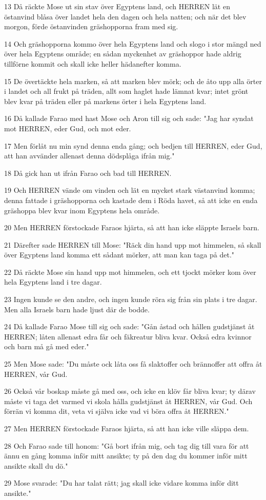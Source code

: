\par 13 Då räckte Mose ut sin stav över Egyptens land, och HERREN lät en östanvind blåsa över landet hela den dagen och hela natten; och när det blev morgon, förde östanvinden gräshopporna fram med sig.
\par 14 Och gräshopporna kommo över hela Egyptens land och slogo i stor mängd ned över hela Egyptens område; en sådan myckenhet av gräshoppor hade aldrig tillförne kommit och skall icke heller hädanefter komma.
\par 15 De övertäckte hela marken, så att marken blev mörk; och de åto upp alla örter i landet och all frukt på träden, allt som haglet hade lämnat kvar; intet grönt blev kvar på träden eller på markens örter i hela Egyptens land.
\par 16 Då kallade Farao med hast Mose och Aron till sig och sade: "Jag har syndat mot HERREN, eder Gud, och mot eder.
\par 17 Men förlåt nu min synd denna enda gång; och bedjen till HERREN, eder Gud, att han avvänder allenast denna dödsplåga ifrån mig."
\par 18 Då gick han ut ifrån Farao och bad till HERREN.
\par 19 Och HERREN vände om vinden och lät en mycket stark västanvind komma; denna fattade i gräshopporna och kastade dem i Röda havet, så att icke en enda gräshoppa blev kvar inom Egyptens hela område.
\par 20 Men HERREN förstockade Faraos hjärta, så att han icke släppte Israels barn.
\par 21 Därefter sade HERREN till Mose: "Räck din hand upp mot himmelen, så skall över Egyptens land komma ett sådant mörker, att man kan taga på det."
\par 22 Då räckte Mose sin hand upp mot himmelen, och ett tjockt mörker kom över hela Egyptens land i tre dagar.
\par 23 Ingen kunde se den andre, och ingen kunde röra sig från sin plats i tre dagar. Men alla Israels barn hade ljust där de bodde.
\par 24 Då kallade Farao Mose till sig och sade: "Gån åstad och hållen gudstjänst åt HERREN; låten allenast edra får och fäkreatur bliva kvar. Också edra kvinnor och barn må gå med eder."
\par 25 Men Mose sade: "Du måste ock låta oss få slaktoffer och brännoffer att offra åt HERREN, vår Gud.
\par 26 Också vår boskap måste gå med oss, och icke en klöv får bliva kvar; ty därav måste vi taga det varmed vi skola hålla gudstjänst åt HERREN, vår Gud. Och förrän vi komma dit, veta vi själva icke vad vi böra offra åt HERREN."
\par 27 Men HERREN förstockade Faraos hjärta, så att han icke ville släppa dem.
\par 28 Och Farao sade till honom: "Gå bort ifrån mig, och tag dig till vara för att ännu en gång komma inför mitt ansikte; ty på den dag du kommer inför mitt ansikte skall du dö."
\par 29 Mose svarade: "Du har talat rätt; jag skall icke vidare komma inför ditt ansikte."

